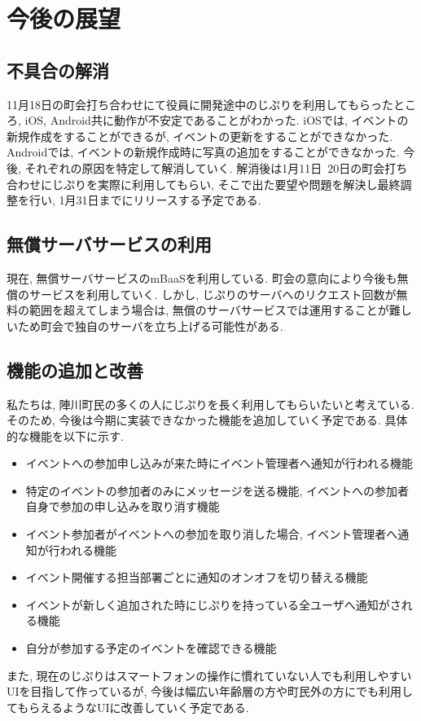 \chapter{今後の展望}

\section{不具合の解消}
11月18日の町会打ち合わせにて役員に開発途中のじぷりを利用してもらったところ, iOS,  Android共に動作が不安定であることがわかった.
iOSでは, イベントの新規作成をすることができるが, イベントの更新をすることができなかった. Androidでは, イベントの新規作成時に写真の追加をすることができなかった.
今後, それぞれの原因を特定して解消していく. 解消後は1月11日~20日の町会打ち合わせにじぷりを実際に利用してもらい, そこで出た要望や問題を解決し最終調整を行い, 1月31日までにリリースする予定である.

\section{無償サーバサービスの利用}
現在, 無償サーバサービスのmBaaSを利用している. 町会の意向により今後も無償のサービスを利用していく. しかし, じぷりのサーバへのリクエスト回数が無料の範囲を超えてしまう場合は,
無償のサーバサービスでは運用することが難しいため町会で独自のサーバを立ち上げる可能性がある.

\section{機能の追加と改善}
私たちは, 陣川町民の多くの人にじぷりを長く利用してもらいたいと考えている. そのため, 今後は今期に実装できなかった機能を追加していく予定である. 具体的な機能を以下に示す.
\begin{itemize}
    \item イベントへの参加申し込みが来た時にイベント管理者へ通知が行われる機能
    \item 特定のイベントの参加者のみにメッセージを送る機能, イベントへの参加者自身で参加の申し込みを取り消す機能
    \item イベント参加者がイベントへの参加を取り消した場合, イベント管理者へ通知が行われる機能
    \item イベント開催する担当部署ごとに通知のオンオフを切り替える機能
    \item イベントが新しく追加された時にじぷりを持っている全ユーザへ通知がされる機能
    \item 自分が参加する予定のイベントを確認できる機能
\end{itemize}
また, 現在のじぷりはスマートフォンの操作に慣れていない人でも利用しやすいUIを目指して作っているが,
今後は幅広い年齢層の方や町民外の方にでも利用してもらえるようなUIに改善していく予定である.
